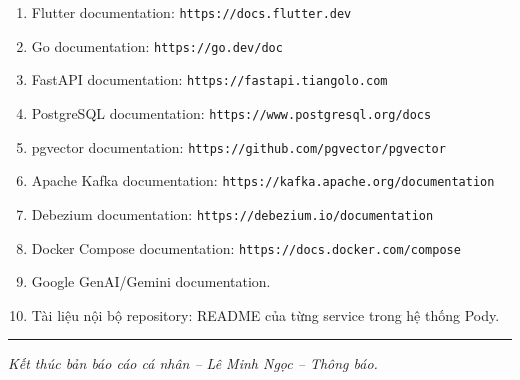 \documentclass[14pt,a4paper,oneside]{extreport}
\begin{document}
\begin{enumerate}[leftmargin=2cm]
  \item Flutter documentation: \texttt{https://docs.flutter.dev}
  \item Go documentation: \texttt{https://go.dev/doc}
  \item FastAPI documentation: \texttt{https://fastapi.tiangolo.com}
  \item PostgreSQL documentation: \texttt{https://www.postgresql.org/docs}
  \item pgvector documentation: \texttt{https://github.com/pgvector/pgvector}
  \item Apache Kafka documentation: \texttt{https://kafka.apache.org/documentation}
  \item Debezium documentation: \texttt{https://debezium.io/documentation}
  \item Docker Compose documentation: \texttt{https://docs.docker.com/compose}
  \item Google GenAI/Gemini documentation.
  \item Tài liệu nội bộ repository: README của từng service trong hệ thống Pody.
\end{enumerate}

\vspace{1cm}
\noindent\rule{\textwidth}{0.4pt}

\noindent
\textit{Kết thúc bản báo cáo cá nhân -- Lê Minh Ngọc -- Thông báo.}
\end{document}
